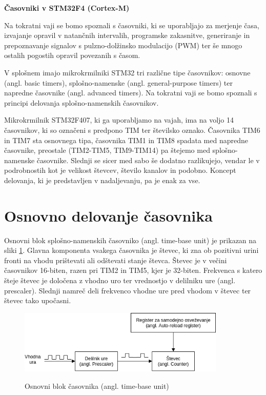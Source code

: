 \documentclass[12pt,letterpaper]{article}
\begin{document}
\begin{center}
    \textbf{\Large Časovniki v STM32F4 (Cortex-M)}
\end{center}

Na tokratni vaji se bomo spoznali s časovniki, ki se uporabljajo za merjenje časa, izvajanje opravil v natančnih intervalih, programske zakasnitve, generiranje in prepoznavanje signalov s pulzno-dolžinsko modulacijo (PWM) ter še mnogo ostalih pogostih opravil povezanih s časom.

V splošnem imajo mikrokrmilniki STM32 tri različne tipe časovnikov: osnovne (angl. basic timers), splošno-namenske (angl. general-purpose timers) ter napredne časovnike (angl. advanced timers). Na tokratni vaji se bomo spoznali s principi delovanja splošno-namenskih časovnikov.

Mikrokrmilnik STM32F407, ki ga uporabljamo na vajah, ima na voljo 14 časovnikov, ki so označeni s predpono TIM ter številsko oznako. Časovnika TIM6 in TIM7 sta osnovnega tipa, časovnika TIM1 in TIM8 spadata med napredne časovnike, preostale (TIM2-TIM5, TIM9-TIM14) pa štejemo med splošno-namenske časovnike. Slednji se sicer med sabo še dodatno razlikujejo, vendar le v podrobnostih kot je velikost števcev, število kanalov in podobno. Koncept delovanja, ki je predstavljen v nadaljevanju, pa je enak za vse.


\section*{Osnovno delovanje časovnika}

Osnovni blok splošno-namenskih časovniko (angl. time-base unit) je prikazan na sliki \ref{timebase}. Glavna komponenta vsakega časovnika je števec, ki zna ob pozitivni urini fronti na vhodu prištevati ali odštevati stanje števca. Števec je v večini časovnikov 16-biten, razen pri TIM2 in TIM5, kjer je 32-biten. Frekvenca s katero šteje števec je določena z vhodno uro ter vrednostjo v delilniku ure (angl. prescaler). Slednji namreč deli frekvenco vhodne ure pred vhodom v števec ter števec tako upočasni.

\begin{figure}[ht!]
  \centering
  \caption{Osnovni blok časovnika (angl. time-base unit)}
  \includegraphics[width=280pt]{images/vaja7/timebase.png}
  \label{timebase}
\end{figure}
\end{document}
